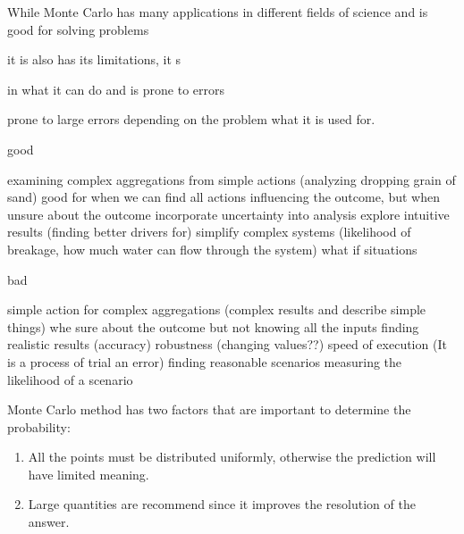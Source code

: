 While Monte Carlo has many applications in different fields of science and is good for solving problems

 it is also has its limitations, it s

 in what it can do and is prone to errors

prone to large errors depending on the problem what it is used for. 

good

examining complex aggregations from simple actions (analyzing dropping grain of sand) good for when we can find all actions influencing the outcome, but when unsure about the outcome
incorporate uncertainty into analysis
explore intuitive results (finding better drivers for)
simplify complex systems (likelihood of breakage, how much water can flow through the system)
what if situations

bad

simple action for complex aggregations (complex results and describe simple things) whe sure about the outcome but not knowing all the inputs
finding realistic results (accuracy)
robustness (changing values??)
speed of execution (It is a process of trial an error)
finding reasonable scenarios
measuring the likelihood of a scenario


\label{subsec:Monte_Carlo_Pitfalls}


Monte Carlo method has two factors that are important to determine the probability:
\begin{enumerate}[1:]
	\item All the points must be distributed uniformly, otherwise the prediction will have limited meaning.
	\item Large quantities are recommend since it improves the resolution of the answer.
\end{enumerate}
